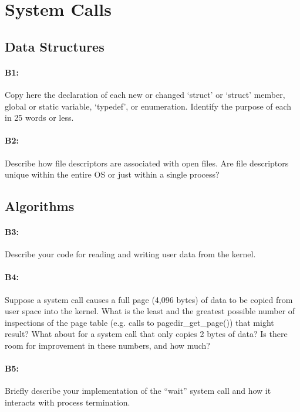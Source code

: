 \section{System Calls}
\subsection{Data Structures}
\paragraph{B1:} %
Copy here the declaration of each new or changed `struct' or `struct' member, global or static variable, `typedef', or enumeration.  Identify the purpose of each in 25 words or less.

\paragraph{B2:} %
Describe how file descriptors are associated with open files. Are file descriptors unique within the entire OS or just within a single process?

\subsection{Algorithms}
\paragraph{B3:} %
Describe your code for reading and writing user data from the kernel.

\paragraph{B4:} %
Suppose a system call causes a full page (4,096 bytes) of data to be copied from user space into the kernel.  What is the least and the greatest possible number of inspections of the page table (e.g. calls to pagedir\_get\_page()) that might result?  What about for a system call that only copies 2 bytes of data?  Is there room for improvement in these numbers, and how much?

\paragraph{B5:} %
Briefly describe your implementation of the ``wait'' system call and how it interacts with process termination.

